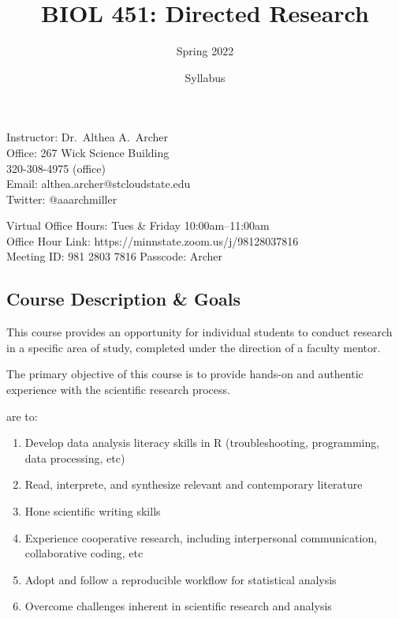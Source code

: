 \documentclass{tufte-handout}
\title{BIOL 451: Directed Research}										%
\author{Spring 2022}										%
\date{Syllabus}
\begin{document}
\maketitle

Instructor: Dr.~Althea A.~Archer\\
Office: 267 Wick Science Building\\
320-308-4975 (office) \\
Email: althea.archer@stcloudstate.edu\\
Twitter: @aaarchmiller

\color{gray} Virtual Office Hours: Tues \& Friday 10:00am--11:00am \\
Office Hour Link: https://minnstate.zoom.us/j/98128037816\\
Meeting ID: 981 2803 7816 Passcode: Archer \color{black}


\begin{fullwidth}

\section{Course Description \& Goals}

This course provides an opportunity for individual students to conduct research in a specific area of study, completed under the direction of a faculty mentor.

The primary objective of this course is to provide hands-on and authentic experience with the scientific research process.

 are to:

\begin{enumerate}
	\item Develop data analysis literacy skills in R (troubleshooting, programming, data processing, etc)
	\item Read, interprete, and synthesize relevant and contemporary literature
	\item Hone scientific writing skills
	\item Experience cooperative research, including interpersonal communication, collaborative coding, etc
	\item Adopt and follow a reproducible workflow for statistical analysis 
	\item Overcome challenges inherent in scientific research and analysis 
\end{enumerate}


\end{fullwidth}
\end{document}
